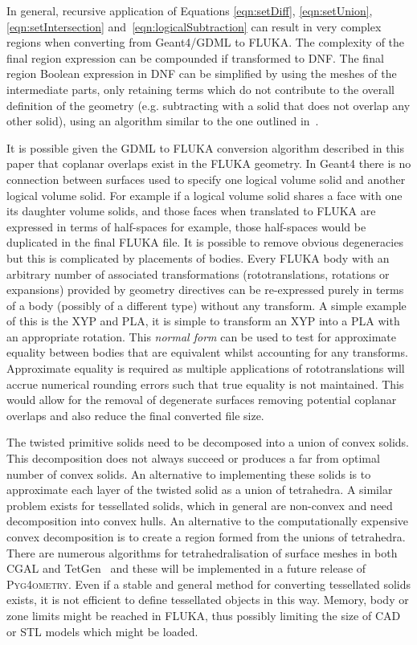 \documentclass[preprint,12pt]{elsarticle}
\newcommand{\PYGEOMETRY}{\textsc{Pyg4ometry}}
\begin{document}
In general, recursive application of Equations \ref{eqn:setDiff},
\ref{eqn:setUnion}, \ref{eqn:setIntersection}
and~\ref{eqn:logicalSubtraction} can result in very complex regions when
converting from Geant4/GDML to FLUKA. The complexity of the final region
expression can be compounded if transformed to DNF. The final region
Boolean expression in DNF can be simplified by using the meshes of the
intermediate parts, only retaining terms which do not contribute to the
overall definition of the geometry (e.g. subtracting with a solid that
does not overlap any other solid), using an algorithm similar to the one
outlined in~\cite{pruning}.

It is possible given the GDML to FLUKA conversion algorithm described in
this paper that coplanar overlaps exist in the FLUKA geometry.  In Geant4
there is no connection between surfaces used to specify one logical volume
solid and another logical volume solid. For example if a logical volume
solid shares a face with one its daughter volume solids, and those faces
when translated to FLUKA are expressed in terms of half-spaces for example,
those half-spaces would be duplicated in the final FLUKA file.  It is
possible to remove obvious degeneracies but this is complicated by
placements of bodies. Every FLUKA body with an arbitrary number of
associated transformations (rototranslations, rotations or expansions)
provided by geometry directives can be re-expressed purely in terms of a
body (possibly of a different type) without any transform. A simple example
of this is the XYP and PLA, it is simple to transform an XYP into a PLA
with an appropriate rotation. This {\em normal form} can be used to test
for approximate equality between bodies that are equivalent whilst
accounting for any transforms.  Approximate equality is required as
multiple applications of rototranslations will accrue numerical rounding
errors such that true equality is not maintained.  This would allow for the
removal of degenerate surfaces removing potential coplanar overlaps and
also reduce the final converted file size.

The twisted primitive solids need to be decomposed
into a union of convex solids. This decomposition does not always
succeed or produces a far from optimal number of convex solids.
An alternative to implementing these solids is to approximate each
layer of the twisted solid as a union of tetrahedra. A similar problem
exists for tessellated solids, which in general
are non-convex and need decomposition into convex hulls. An alternative
to the computationally expensive convex decomposition is to
create a region formed from the unions of tetrahedra. There are numerous
algorithms for tetrahedralisation of surface meshes in both CGAL and TetGen~\cite{tetgen}
and these will be implemented in a future release of \PYGEOMETRY{}. Even if a stable and general
method for converting tessellated solids exists, it is not efficient to define
tessellated objects in this way.  Memory, body or zone limits might
be reached in FLUKA, thus possibly limiting the size of CAD or STL models which
might be loaded.
\end{document}
